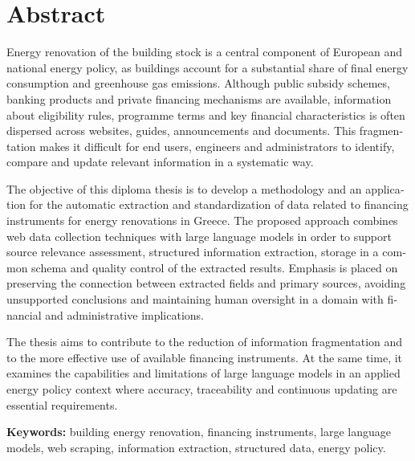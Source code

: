 \chapter*{Abstract}

\begin{english}
Energy renovation of the building stock is a central component of European
and national energy policy, as buildings account for a substantial share of
final energy consumption and greenhouse gas emissions. Although public
subsidy schemes, banking products and private financing mechanisms are
available, information about eligibility rules, programme terms and key
financial characteristics is often dispersed across websites, guides,
announcements and documents. This fragmentation makes it difficult for end
users, engineers and administrators to identify, compare and update relevant
information in a systematic way.

The objective of this diploma thesis is to develop a methodology and an
application for the automatic extraction and standardization of data related
to financing instruments for energy renovations in Greece. The proposed
approach combines web data collection techniques with large language models in
order to support source relevance assessment, structured information
extraction, storage in a common schema and quality control of the extracted
results. Emphasis is placed on preserving the connection between extracted
fields and primary sources, avoiding unsupported conclusions and maintaining
human oversight in a domain with financial and administrative implications.

The thesis aims to contribute to the reduction of information fragmentation
and to the more effective use of available financing instruments. At the same
time, it examines the capabilities and limitations of large language models in
an applied energy policy context where accuracy, traceability and continuous
updating are essential requirements.

\vspace{0.8cm}
\noindent\textbf{Keywords:} building energy renovation, financing instruments,
large language models, web scraping, information extraction, structured data,
energy policy.
\end{english}
\clearpage
